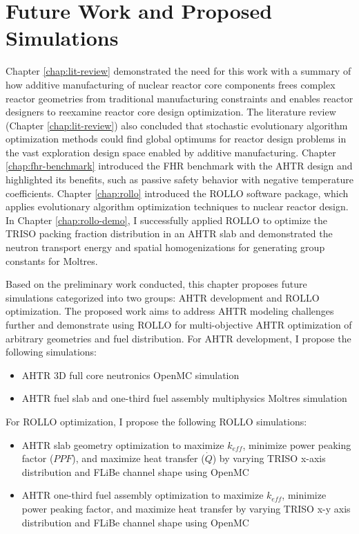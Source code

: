 \chapter{Future Work and Proposed Simulations}

Chapter \ref{chap:lit-review} demonstrated the need for this work with a summary
of how additive manufacturing of nuclear reactor core components frees complex 
reactor geometries from traditional manufacturing constraints and enables 
reactor designers to reexamine reactor core design optimization.
The literature review (Chapter \ref{chap:lit-review}) also concluded that 
stochastic evolutionary algorithm optimization methods could find global 
optimums for reactor design problems in the vast exploration design space 
enabled by additive manufacturing. 
Chapter \ref{chap:fhr-benchmark} introduced the \acrfull{FHR} benchmark with 
the \gls{AHTR} design and highlighted its benefits, such as passive safety 
behavior with negative temperature coefficients. 
Chapter \ref{chap:rollo} introduced the \acrfull{ROLLO} software package, 
which applies evolutionary algorithm optimization techniques to nuclear 
reactor design. 
In Chapter \ref{chap:rollo-demo}, I successfully applied \gls{ROLLO} 
to optimize the \gls{TRISO} packing fraction distribution in an \gls{AHTR} slab
and demonstrated the neutron transport energy and spatial homogenizations for 
generating group constants for Moltres. 

Based on the preliminary work conducted, this chapter proposes 
future simulations categorized into two groups: \gls{AHTR} development and 
\gls{ROLLO} optimization. 
The proposed work aims to address \gls{AHTR} modeling challenges further and 
demonstrate using \gls{ROLLO} for multi-objective \gls{AHTR} 
optimization of arbitrary geometries and fuel distribution. 
For \gls{AHTR} development, I propose the following simulations: 
\begin{itemize}
    \item \gls{AHTR} 3D full core neutronics OpenMC simulation
    \item \gls{AHTR} fuel slab and one-third fuel assembly multiphysics 
    Moltres simulation
\end{itemize}
For \gls{ROLLO} optimization, I propose the following \gls{ROLLO} simulations: 
\begin{itemize}
    \item \gls{AHTR} slab geometry optimization to maximize $k_{eff}$, 
    minimize power peaking factor ($PPF$), and maximize heat transfer ($\dot{Q}$) by varying \gls{TRISO} 
    x-axis distribution and \gls{FLiBe} channel shape using OpenMC
    \item \gls{AHTR} one-third fuel assembly optimization to maximize $k_{eff}$, 
    minimize power peaking factor, and maximize heat transfer by varying \gls{TRISO} 
    x-y axis distribution and \gls{FLiBe} channel shape using OpenMC
\end{itemize}

